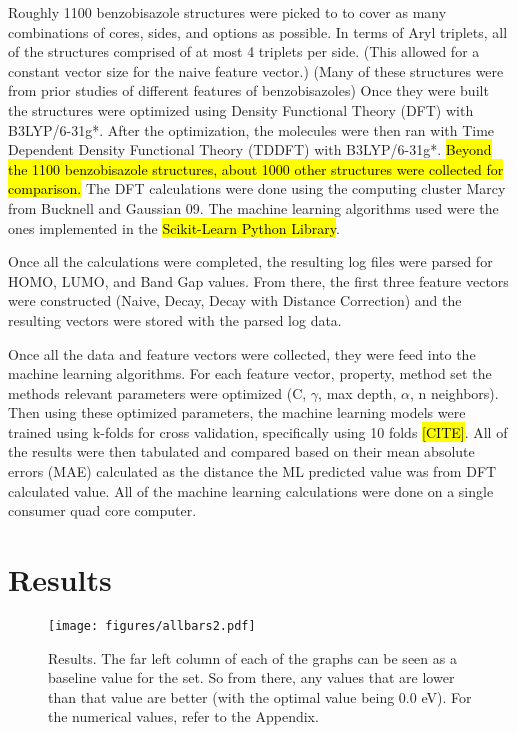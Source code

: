 \documentclass[10pt]{article}
\begin{document}
Roughly 1100 benzobisazole structures were picked to to cover as many combinations of cores, sides, and options as possible. In terms of Aryl triplets, all of the structures comprised of at most 4 triplets per side. (This allowed for a constant vector size for the naive feature vector.) (Many of these structures were from prior studies of different features of benzobisazoles) Once they were built the structures were optimized using Density Functional Theory (DFT) with B3LYP/6-31g*. After the optimization, the molecules were then ran with Time Dependent Density Functional Theory (TDDFT) with B3LYP/6-31g*. \hl{Beyond the 1100 benzobisazole structures, about 1000 other structures were collected for comparison.} The DFT calculations were done using the computing cluster Marcy from Bucknell and Gaussian 09. The machine learning algorithms used were the ones implemented in the \hl{Scikit-Learn Python Library}.

Once all the calculations were completed, the resulting log files were parsed for HOMO, LUMO, and Band Gap values. From there, the first three feature vectors were constructed (Naive, Decay, Decay with Distance Correction) and the resulting vectors were stored with the parsed log data.

Once all the data and feature vectors were collected, they were feed into the machine learning algorithms. For each feature vector, property, method set the methods relevant parameters were optimized (C, $\gamma$, max depth, $\alpha$, n neighbors). Then using these optimized parameters, the machine learning models were trained using k-folds for cross validation, specifically using 10 folds \hl{[CITE]}. All of the results were then tabulated and compared based on their mean absolute errors (MAE) calculated as the distance the ML predicted value was from DFT calculated value. All of the machine learning calculations were done on a single consumer quad core computer.

\section{Results}

 \begin{figure}[H]
   \begin{center}
     \texttt{[image: figures/allbars2.pdf]}
   \end{center}
   \caption{Results. The far left column of each of the graphs can be seen as a baseline value for the set. So from there, any values that are lower than that value are better (with the optimal value being 0.0 eV). For the numerical values, refer to the Appendix.}
   \label{fig:results}
 \end{figure}
\end{document}

